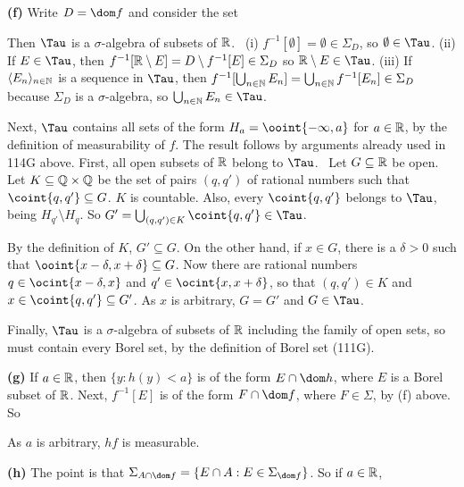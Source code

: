 {\medskip
     
{\bf (f)} Write $D=\dom f$ and consider the set
     
     
\noindent Then $\Tau$ is a $\sigma$-algebra of subsets of $\Bbb R$.
\Prf\ {(i)} $f^{-1}[\emptyset]=\emptyset\in\Sigma_D$, so
$\emptyset\in\Tau$.   {(ii)} If $E\in\Tau$, then
$f^{-1}[\Bbb R\setminus E]=D\setminus f^{-1}[E]\in\Sigma_D$ so
$\Bbb R\setminus E\in\Tau$.
{(iii)} If $\langle E_n\rangle_{n\in\Bbb N}$ is a sequence in
$\Tau$, then
$f^{-1}[\bigcup_{n\in\Bbb N}E_n]
=\bigcup_{n\in\Bbb N}f^{-1}[E_n]\in\Sigma_D$ because $\Sigma_D$ is a
$\sigma$-algebra, so $\bigcup_{n\in\Bbb N}E_n\in\Tau$.\ \Qed
     
Next, $\Tau$ contains all sets of the form $H_a=\ooint{-\infty,a}$ for
$a\in\Bbb R$, by the definition of measurability of $f$.   The result
follows by arguments already used in 114G above.
First, all open subsets of $\Bbb R$
belong to $\Tau$.   \Prf\ Let $G\subseteq\Bbb R$ be open.   Let
$K\subseteq\Bbb Q\times\Bbb Q$ be the set of pairs $(q,q')$ of rational
numbers such that $\coint{q,q'}\subseteq G$.    $K$
is countable.   Also, every $\coint{q,q'}$ belongs to $\Tau$, being
$H_{q'}\setminus H_q$.   So
$G'=\bigcup_{(q,q')\in K}\coint{q,q'}\in\Tau$.
     
By the definition of $K$, $G'\subseteq G$.   On the other hand, if $x\in
G$, there is a $\delta>0$
such that $\ooint{x-\delta,x+\delta}\subseteq G$.
Now there are rational numbers $q\in\ocint{x-\delta,x}$ and
$q'\in\ocint{x,x+\delta}$, so that $(q,q')\in K$ and $x\in
\coint{q,q'}\subseteq G'$.
As $x$ is arbitrary, $G=G'$ and $G\in\Tau$.\ \Qed
     
Finally, $\Tau$ is a
$\sigma$-algebra of subsets of $\Bbb R$ including the family of open
sets, so must contain every Borel set, by the definition of Borel set
(111G).
     
\medskip
     
{\bf (g)} If $a\in\Bbb R$, then $\{y:h(y)<a\}$ is of the form 
$E\cap\dom h$, where $E$ is a Borel subset of $\Bbb R$.   
Next, $f^{-1}[E]$ is of
the form $F\cap\dom f$, where $F\in\Sigma$, by (f) above.   So
     
     
\noindent   As $a$ is
arbitrary, $hf$ is measurable.
     
\medskip
     
{\bf (h)} The point is that $\Sigma_{A\cap\dom f}=\{E\cap
A:E\in\Sigma_{\dom f}\}$.   So if $a\in\Bbb R$,
     
}%
     
